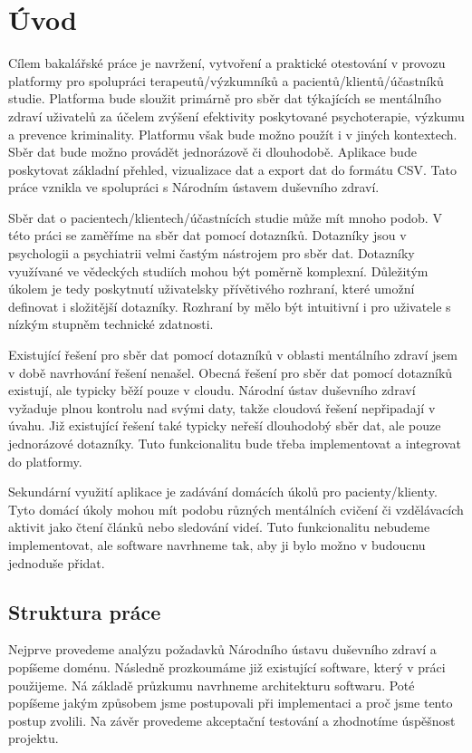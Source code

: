 \chapter*{Úvod}

Cílem bakalářské práce je navržení, vytvoření a praktické otestování v provozu platformy pro spolupráci terapeutů/výzkumníků a pacientů/klientů/účastníků studie.
Platforma bude sloužit primárně pro sběr dat týkajících se mentálního zdraví uživatelů za účelem zvýšení efektivity poskytované psychoterapie, výzkumu a prevence kriminality.
Platformu však bude možno použít i v jiných kontextech.
Sběr dat bude možno provádět jednorázově či dlouhodobě.
Aplikace bude poskytovat základní přehled, vizualizace dat a export dat do formátu CSV.
Tato práce vznikla ve spolupráci s Národním ústavem duševního zdraví.

Sběr dat o pacientech/klientech/účastnících studie může mít mnoho podob.
V této práci se zaměříme na sběr dat pomocí dotazníků. 
Dotazníky jsou v psychologii a psychiatrii velmi častým nástrojem pro sběr dat. 
Dotazníky využívané ve vědeckých studiích mohou být poměrně komplexní.
Důležitým úkolem je tedy poskytnutí uživatelsky přívětivého rozhraní, které umožní definovat i složitější dotazníky.
Rozhraní by mělo být intuitivní i pro uživatele s nízkým stupněm technické zdatnosti.

Existující řešení pro sběr dat pomocí dotazníků v oblasti mentálního zdraví jsem v době navrhování řešení nenašel. 
Obecná řešení pro sběr dat pomocí dotazníků existují, ale typicky běží pouze v cloudu. 
Národní ústav duševního zdraví vyžaduje plnou kontrolu nad svými daty, takže cloudová řešení nepřipadají v úvahu. 
Již existující řešení také typicky neřeší dlouhodobý sběr dat, ale pouze jednorázové dotazníky. 
Tuto funkcionalitu bude třeba implementovat a integrovat do platformy.

Sekundární využití aplikace je zadávání domácích úkolů pro pacienty/klienty.
Tyto domácí úkoly mohou mít podobu různých mentálních cvičení či vzdělávacích aktivit jako čtení článků nebo sledování videí.
Tuto funkcionalitu nebudeme implementovat, ale software navrhneme tak, aby ji bylo možno v budoucnu jednoduše přidat.

\section*{Struktura práce}\label{sec:struktura-prace}

Nejprve provedeme analýzu požadavků Národního ústavu duševního zdraví a popíšeme doménu.
Následně prozkoumáme již existující software, který v práci použijeme. 
Ná základě průzkumu navrhneme architekturu softwaru.
Poté popíšeme jakým způsobem jsme postupovali při implementaci a proč jsme tento postup zvolili.
Na závěr provedeme akceptační testování a zhodnotíme úspěšnost projektu.